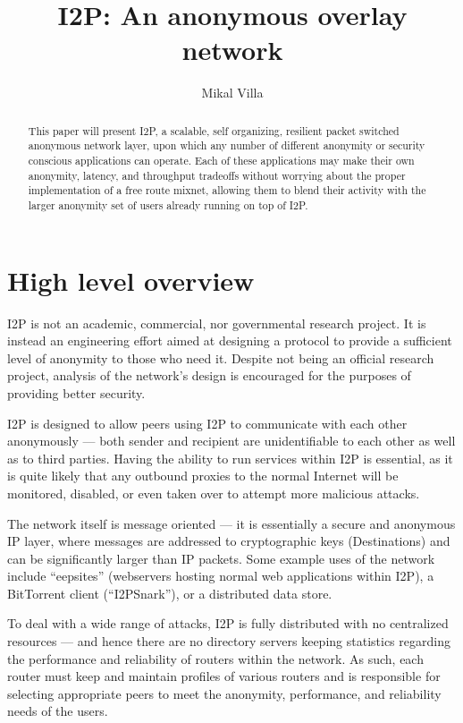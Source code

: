 \documentclass[a4paper,twocolumn,12pt]{article}
\title{I2P: An anonymous overlay network}
\author{Mikal Villa}
\begin{document}
\maketitle

\begin{abstract}\noindent
This paper will present I2P, a scalable, self organizing, resilient packet
switched anonymous network layer, upon which any number of different
anonymity or security conscious applications can operate. Each of these
applications may make their own anonymity, latency, and throughput tradeoffs
without worrying about the proper implementation of a free route mixnet,
allowing them to blend their activity with the larger anonymity set of users
already running on top of I2P.
\end{abstract}

\tableofcontents

\section{High level overview}
I2P is not an academic, commercial, nor governmental research project. It is 
instead an engineering effort aimed at designing a protocol to provide a 
sufficient level of anonymity to those who need it. Despite not being an 
official research project, analysis of the network's design is encouraged for 
the purposes of providing better security.

I2P is designed to allow peers using I2P to communicate with each other
anonymously --- both sender and recipient are unidentifiable to each other
as well as to third parties. Having the ability to run services within I2P
is essential, as it is quite likely that any outbound proxies to the normal
Internet will be monitored, disabled, or even taken over to attempt more
malicious attacks.

The network itself is message oriented --- it is essentially a secure and anonymous
IP layer, where messages are addressed to cryptographic keys (Destinations) and can
be significantly larger than IP packets. Some example uses of the network include
``eepsites'' (webservers hosting normal web applications within I2P), a BitTorrent\cite{cohen08specification}
client (``I2PSnark''), or a distributed data store.

To deal with a wide range of attacks, I2P is fully distributed with no centralized
resources --- and hence there are no directory servers keeping statistics regarding
the performance and reliability of routers within the network. As such, each router
must keep and maintain profiles of various routers and is responsible for selecting
appropriate peers to meet the anonymity, performance, and reliability needs of the users.
\end{document}
